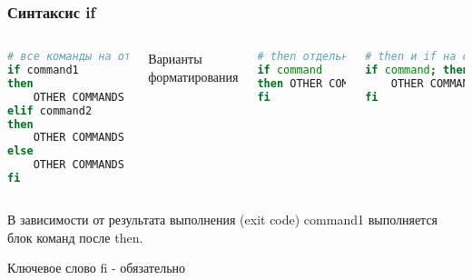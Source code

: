 \begin{frame}[fragile]
\frametitle{Синтаксис {\bf if}}

	\begin{columns}
	
	\begin{lstlisting}[language=bash]
# все команды на отдельной строке
if command1
then
    OTHER COMMANDS
elif command2
then
    OTHER COMMANDS
else
    OTHER COMMANDS
fi
\end{lstlisting}
Варианты форматирования
	\begin{lstlisting}[language=bash]
# then отдельной строкой
if command
then OTHER COMMANDS 
fi
\end{lstlisting}

	\begin{lstlisting}[language=bash]
# then и if на одной строке
if command; then 
    OTHER COMMANDS
fi
\end{lstlisting}
	\end{columns}

В зависимости от результата выполнения (exit code) command1 выполняется блок команд после then.   

Ключевое слово fi - обязательно

%
\end{frame}
